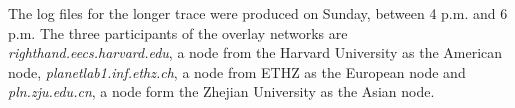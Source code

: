 \documentclass[paper=a4, fontsize=11pt]{scrartcl} %
\numberwithin{equation}{section} %
\numberwithin{figure}{section} %
\numberwithin{table}{section} %
\begin{document}
The log files for the longer trace were produced on Sunday, between 4 p.m. and 6 p.m. The three participants of the overlay networks are \textit{righthand.eecs.harvard.edu}, a node from the Harvard University as the American node, \textit{planetlab1.inf.ethz.ch}, a node from ETHZ as the European node and \textit{pln.zju.edu.cn}, a node form the Zhejian University as the Asian node.

\end{document}
